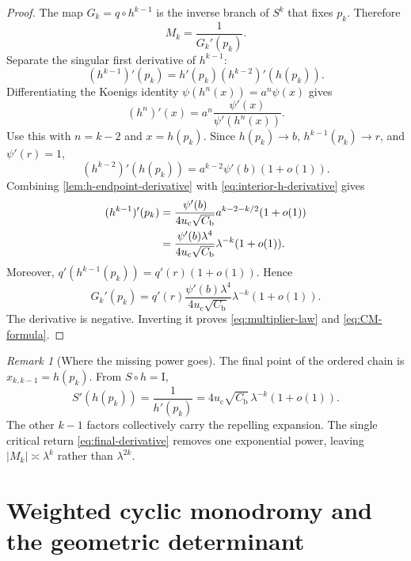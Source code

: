 \documentclass[11pt]{article}
\theoremstyle{definition}
\theoremstyle{remark}
\newtheorem{remark}[theorem]{Remark}
\newcommand{\uc}{u_{\mathrm c}}
\newcommand{\Id}{\mathrm I}
\begin{document}
\begin{proof}
The map $G_k=q\circ h^{k-1}$ is the inverse branch of $S^k$ that fixes
$p_k$.  Therefore
\begin{equation}\label{eq:inverse-multiplier}
 M_k=\frac1{G_k'(p_k)}.
\end{equation}
Separate the singular first derivative of $h^{k-1}$:
\begin{equation}\label{eq:split-h-derivative}
 (h^{k-1})'(p_k)
 =h'(p_k)(h^{k-2})'(h(p_k)).
\end{equation}
Differentiating the Koenigs identity
$\psi(h^n(x))=a^n\psi(x)$ gives
\begin{equation}\label{eq:koenigs-derivative}
 (h^n)'(x)
 =a^n\frac{\psi'(x)}{\psi'(h^n(x))}.
\end{equation}
Use this with $n=k-2$ and $x=h(p_k)$.  Since
$h(p_k)\to b$, $h^{k-1}(p_k)\to r$, and $\psi'(r)=1$,
\begin{equation}\label{eq:interior-h-derivative}
 (h^{k-2})'(h(p_k))
 =a^{k-2}\psi'(b)(1+o(1)).
\end{equation}
Combining \cref{lem:h-endpoint-derivative} with
\eqref{eq:interior-h-derivative} gives
\begin{align}
 (h^{k-1})'(p_k)
 &=\frac{\psi'(b)}{4\uc\sqrt{C_{\mathrm b}}}
 a^{k-2-k/2}(1+o(1))\notag\\
 &=\frac{\psi'(b)\lambda^4}{4\uc\sqrt{C_{\mathrm b}}}
 \lambda^{-k}(1+o(1)).
 \label{eq:h-full-asymptotic}
\end{align}
Moreover,
$q'(h^{k-1}(p_k))=q'(r)(1+o(1))$.  Hence
\[
 G_k'(p_k)
 =q'(r)\frac{\psi'(b)\lambda^4}
 {4\uc\sqrt{C_{\mathrm b}}}
 \lambda^{-k}(1+o(1)).
\]
The derivative is negative.  Inverting it proves
\eqref{eq:multiplier-law} and \eqref{eq:CM-formula}.
\end{proof}

\begin{remark}[Where the missing power goes]
\label{rem:critical-cancellation}
The final point of the ordered chain is $x_{k,k-1}=h(p_k)$.  From
$S\circ h=\Id$,
\begin{equation}\label{eq:final-derivative}
 S'(h(p_k))=\frac1{h'(p_k)}
 =4\uc\sqrt{C_{\mathrm b}}\,\lambda^{-k}(1+o(1)).
\end{equation}
The other $k-1$ factors collectively carry the repelling expansion.  The
single critical return \eqref{eq:final-derivative} removes one exponential
power, leaving $|M_k|\asymp\lambda^k$ rather than
$\lambda^{2k}$.
\end{remark}

\section{Weighted cyclic monodromy and the geometric determinant}
\label{sec:cycle-determinant}
\end{document}
